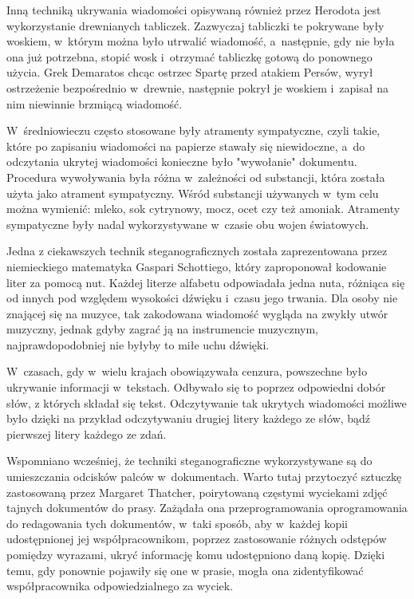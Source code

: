 \documentclass[a4paper, twoside, 12pt]{report}
\begin{document}
        Inną techniką ukrywania wiadomości opisywaną również przez Herodota
        jest wykorzystanie drewnianych tabliczek. Zazwyczaj tabliczki te pokrywane
        były woskiem, w~którym można było utrwalić wiadomość, a~następnie, gdy
        nie była ona już potrzebna, stopić wosk i~otrzymać tabliczkę gotową do
        ponownego użycia. Grek Demaratos chcąc ostrzec Spartę przed atakiem Persów,
        wyrył ostrzeżenie bezpośrednio w~drewnie, następnie pokrył je woskiem
        i~zapisał na nim niewinnie brzmiącą wiadomość.

        W~średniowieczu często stosowane były atramenty sympatyczne, czyli takie,
        które po zapisaniu wiadomości na papierze stawały się niewidoczne, a~do
        odczytania ukrytej wiadomości konieczne było "wywołanie" dokumentu. Procedura
        wywoływania była różna w~zależności od substancji, która została użyta jako
        atrament sympatyczny. Wśród substancji używanych w~tym celu można wymienić:
        mleko, sok cytrynowy, mocz, ocet czy też amoniak. Atramenty sympatyczne
        były nadal wykorzystywane w~czasie obu wojen światowych.

        Jedna z ciekawszych technik steganograficznych została zaprezentowana przez
        niemieckiego matematyka Gaspari Schottiego\cite{NUTYSTEGANOGRAFIA},
        który zaproponował kodowanie liter za pomocą nut. Każdej literze alfabetu
        odpowiadała jedna nuta, różniąca się od innych pod względem wysokości
        dźwięku i~czasu jego trwania. Dla osoby nie znającej się na muzyce, tak zakodowana
        wiadomość wygląda na zwykły utwór muzyczny, jednak gdyby zagrać ją na instrumencie
        muzycznym, najprawdopodobniej nie byłyby to miłe uchu dźwięki.

        W~czasach, gdy w~wielu krajach obowiązywała cenzura, powszechne było ukrywanie
        informacji w~tekstach. Odbywało się to poprzez odpowiedni dobór słów,
        z których składał się tekst. Odczytywanie tak ukrytych wiadomości możliwe było
        dzięki na przykład odczytywaniu drugiej litery każdego ze słów, bądź pierwszej
        litery każdego ze zdań.

        Wspomniano wcześniej, że techniki steganograficzne wykorzystywane są do umieszczania
        odcisków palców w~dokumentach. Warto tutaj przytoczyć sztuczkę zastosowaną
        przez Margaret Thatcher, poirytowaną częstymi wyciekami zdjęć tajnych dokumentów
        do prasy. Zażądała ona przeprogramowania oprogramowania do redagowania tych
        dokumentów, w~taki sposób, aby w~każdej kopii udostępnionej jej współpracownikom,
        poprzez zastosowanie różnych odstępów pomiędzy wyrazami, ukryć informację
        komu udostępniono daną kopię. Dzięki temu, gdy ponownie pojawiły się one w
        prasie, mogła ona zidentyfikować współpracownika odpowiedzialnego za wyciek\cite{DIGITALWATERMARKING}.
\end{document}
